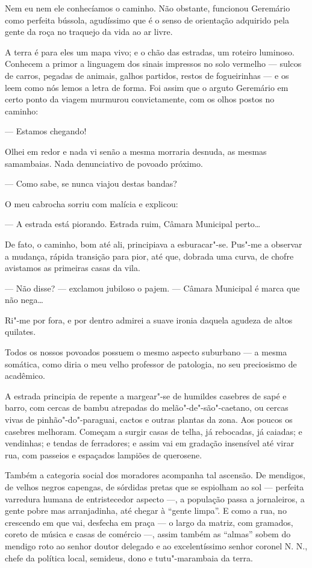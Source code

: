 Nem eu nem ele conhecíamos o caminho. Não obstante, funcionou Geremário
como perfeita bússola, agudíssimo que é o senso de orientação adquirido
pela gente da roça no traquejo da vida ao ar livre.

A terra é para eles um mapa vivo; e o chão das estradas, um roteiro
luminoso. Conhecem a primor a linguagem dos sinais impressos no solo
vermelho --- sulcos de carros, pegadas de animais, galhos partidos,
restos de fogueirinhas --- e os leem como nós lemos a letra de forma.
Foi assim que o arguto Geremário em certo ponto da viagem murmurou
convictamente, com os olhos postos no caminho:

--- Estamos chegando!

Olhei em redor e nada vi senão a mesma morraria desnuda, as mesmas
samambaias. Nada denunciativo de povoado próximo.

--- Como sabe, se nunca viajou destas bandas?

O meu cabrocha sorriu com malícia e explicou:

--- A estrada está piorando. Estrada ruim, Câmara Municipal perto\ldots{}

De fato, o caminho, bom até ali, principiava a esburacar"-se. Pus"-me a
observar a mudança, rápida transição para pior, até que, dobrada uma
curva, de chofre avistamos as primeiras casas da vila.

--- Não disse? --- exclamou jubiloso o pajem. --- Câmara Municipal é
marca que não nega\ldots{}

Ri"-me por fora, e por dentro admirei a suave ironia daquela agudeza de
altos quilates.

Todos os nossos povoados possuem o mesmo aspecto suburbano --- a mesma
somática, como diria o meu velho professor de patologia, no seu
preciosismo de acadêmico.

A estrada principia de repente a margear"-se de humildes casebres de sapé
e barro, com cercas de bambu atrepadas do melão"-de"-são"-caetano, ou
cercas vivas de pinhão"-do"-paraguai, cactos e outras plantas da zona. Aos
poucos os casebres melhoram. Começam a surgir casas de telha, já
rebocadas, já caiadas; e vendinhas; e tendas de ferradores; e assim vai
em gradação insensível até virar rua, com passeios e espaçados lampiões
de querosene.

Também a categoria social dos moradores acompanha tal ascensão. De
mendigos, de velhos negros capengas, de sórdidas pretas que se espiolham
ao sol --- perfeita varredura humana de entristecedor aspecto ---, a
população passa a jornaleiros, a gente pobre mas arranjadinha, até
chegar à ``gente limpa''. E como a rua, no crescendo em que vai,
desfecha em praça --- o largo da matriz, com gramados, coreto de música
e casas de comércio ---, assim também as ``almas'' sobem do mendigo roto
ao senhor doutor delegado e ao excelentíssimo senhor coronel N. N.,
chefe da política local, semideus, dono e tutu"-marambaia da terra.

